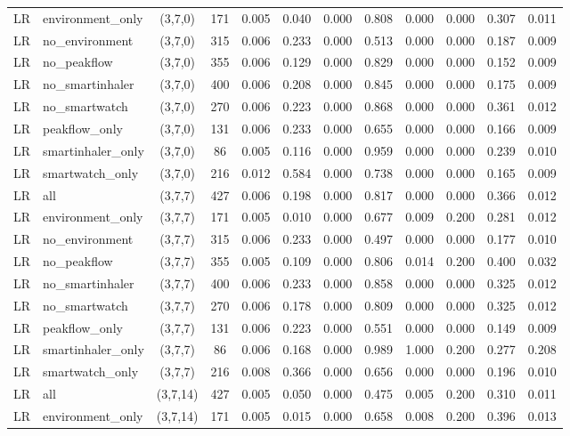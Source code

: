 \begin{longtable}{llcccccccccc}
LR & environment\_only & (3,7,0) & 171 & 0.005 & 0.040 & 0.000 & 0.808 & 0.000 & 0.000 & 0.307 & 0.011 \\
LR & no\_environment & (3,7,0) & 315 & 0.006 & 0.233 & 0.000 & 0.513 & 0.000 & 0.000 & 0.187 & 0.009 \\
LR & no\_peakflow & (3,7,0) & 355 & 0.006 & 0.129 & 0.000 & 0.829 & 0.000 & 0.000 & 0.152 & 0.009 \\
LR & no\_smartinhaler & (3,7,0) & 400 & 0.006 & 0.208 & 0.000 & 0.845 & 0.000 & 0.000 & 0.175 & 0.009 \\
LR & no\_smartwatch & (3,7,0) & 270 & 0.006 & 0.223 & 0.000 & 0.868 & 0.000 & 0.000 & 0.361 & 0.012 \\
LR & peakflow\_only & (3,7,0) & 131 & 0.006 & 0.233 & 0.000 & 0.655 & 0.000 & 0.000 & 0.166 & 0.009 \\
LR & smartinhaler\_only & (3,7,0) & 86 & 0.005 & 0.116 & 0.000 & 0.959 & 0.000 & 0.000 & 0.239 & 0.010 \\
LR & smartwatch\_only & (3,7,0) & 216 & 0.012 & 0.584 & 0.000 & 0.738 & 0.000 & 0.000 & 0.165 & 0.009 \\
LR & all & (3,7,7) & 427 & 0.006 & 0.198 & 0.000 & 0.817 & 0.000 & 0.000 & 0.366 & 0.012 \\
LR & environment\_only & (3,7,7) & 171 & 0.005 & 0.010 & 0.000 & 0.677 & 0.009 & 0.200 & 0.281 & 0.012 \\
LR & no\_environment & (3,7,7) & 315 & 0.006 & 0.233 & 0.000 & 0.497 & 0.000 & 0.000 & 0.177 & 0.010 \\
LR & no\_peakflow & (3,7,7) & 355 & 0.005 & 0.109 & 0.000 & 0.806 & 0.014 & 0.200 & 0.400 & 0.032 \\
LR & no\_smartinhaler & (3,7,7) & 400 & 0.006 & 0.233 & 0.000 & 0.858 & 0.000 & 0.000 & 0.325 & 0.012 \\
LR & no\_smartwatch & (3,7,7) & 270 & 0.006 & 0.178 & 0.000 & 0.809 & 0.000 & 0.000 & 0.325 & 0.012 \\
LR & peakflow\_only & (3,7,7) & 131 & 0.006 & 0.223 & 0.000 & 0.551 & 0.000 & 0.000 & 0.149 & 0.009 \\
LR & smartinhaler\_only & (3,7,7) & 86 & 0.006 & 0.168 & 0.000 & 0.989 & 1.000 & 0.200 & 0.277 & 0.208 \\
LR & smartwatch\_only & (3,7,7) & 216 & 0.008 & 0.366 & 0.000 & 0.656 & 0.000 & 0.000 & 0.196 & 0.010 \\
LR & all & (3,7,14) & 427 & 0.005 & 0.050 & 0.000 & 0.475 & 0.005 & 0.200 & 0.310 & 0.011 \\
LR & environment\_only & (3,7,14) & 171 & 0.005 & 0.015 & 0.000 & 0.658 & 0.008 & 0.200 & 0.396 & 0.013 \\

\end{longtable}
